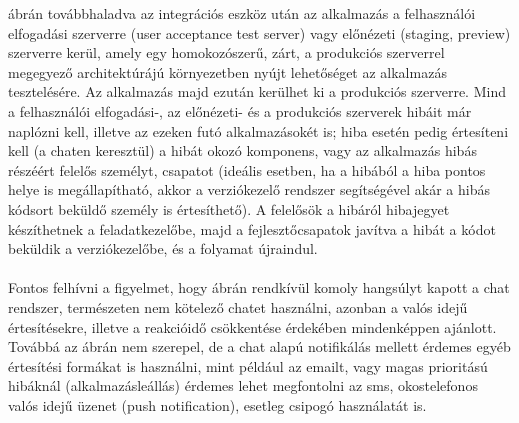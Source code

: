  ábrán továbbhaladva az integrációs eszköz után az alkalmazás a felhasználói elfogadási szerverre (user acceptance test server) vagy előnézeti (staging, preview) szerverre kerül, amely egy homokozószerű, zárt, a produkciós szerverrel megegyező architektúrájú környezetben nyújt lehetőséget az alkalmazás tesztelésére. Az alkalmazás majd ezután kerülhet ki a produkciós szerverre. Mind a felhasználói elfogadási-, az előnézeti- és a produkciós szerverek hibáit már naplózni kell, illetve az ezeken futó alkalmazásokét is; hiba esetén pedig értesíteni kell (a chaten keresztül) a hibát okozó komponens, vagy az alkalmazás hibás részéért felelős személyt, csapatot (ideális esetben, ha a hibából a hiba pontos helye is megállapítható, akkor a verziókezelő rendszer segítségével akár a hibás kódsort beküldő személy is értesíthető). A felelősök a hibáról hibajegyet készíthetnek a feladatkezelőbe, majd a fejlesztőcsapatok javítva a hibát a kódot beküldik a verziókezelőbe, és a folyamat újraindul.\\
\hfill\\
Fontos felhívni a figyelmet, hogy  ábrán rendkívül komoly hangsúlyt kapott a chat rendszer, természeten nem kötelező chatet használni, azonban a valós idejű értesítésekre, illetve a reakcióidő csökkentése érdekében mindenképpen ajánlott. Továbbá az ábrán nem szerepel, de a chat alapú notifikálás mellett érdemes egyéb értesítési formákat is használni, mint például az emailt, vagy magas prioritású hibáknál (alkalmazásleállás) érdemes lehet megfontolni az sms, okostelefonos valós idejű üzenet (push notification), esetleg csipogó használatát is.

